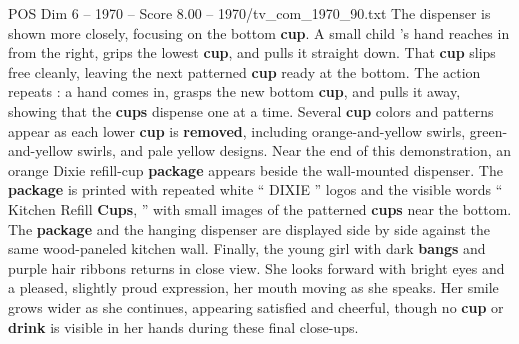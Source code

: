 \begin{textsample}{POS Dim 6 – 1970 – Score 8.00 – 1970/tv\_com\_1970\_90.txt}
The dispenser is shown more closely, focusing on the bottom \textbf{cup}.
A small child ’s hand reaches in from the right, grips the lowest \textbf{cup}, and pulls it straight down.
That \textbf{cup} slips free cleanly, leaving the next patterned \textbf{cup} ready at the bottom.
The action repeats : a hand comes in, grasps the new bottom \textbf{cup}, and pulls it away, showing that the \textbf{cups} dispense one at a time.
Several \textbf{cup} colors and patterns appear as each lower \textbf{cup} is \textbf{removed}, including orange-and-yellow swirls, green-and-yellow swirls, and pale yellow designs.
Near the end of this demonstration, an orange Dixie refill-cup \textbf{package} appears beside the wall-mounted dispenser.
The \textbf{package} is printed with repeated white “ DIXIE ” logos and the visible words “ Kitchen Refill \textbf{Cups}, ” with small images of the patterned \textbf{cups} near the bottom.
The \textbf{package} and the hanging dispenser are displayed side by side against the same wood-paneled kitchen wall.
Finally, the young girl with dark \textbf{bangs} and purple hair ribbons returns in close view.
She looks forward with bright eyes and a pleased, slightly proud expression, her mouth moving as she speaks.
Her smile grows wider as she continues, appearing satisfied and cheerful, though no \textbf{cup} or \textbf{drink} is visible in her hands during these final close-ups.

\end{textsample}
